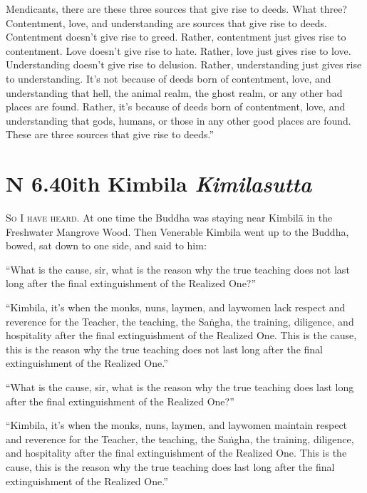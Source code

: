 \documentclass[12pt,openany]{book}%
\newcommand*{\suttatitleacronym}[1]{\smaller[2]{#1}\vspace*{.3em}}
\newcommand*{\suttatitletranslation}[1]{\linebreak{#1}}
\newcommand*{\suttatitleroot}[1]{\linebreak\smaller[2]\itshape{#1}}
\newcommand*{\tocacronym}[1]{\hspace*{-3.3em}{#1}\quad}
\newcommand*{\toctranslation}[1]{#1}
\newcommand*{\tocroot}[1]{(\textit{#1})}
\newcommand*{\scevam}[1]{\textsc{#1}}
\begin{document}
Mendicants, there are these three sources that give rise to deeds. What three? Contentment, love, and understanding are sources that give rise to deeds. Contentment doesn’t give rise to greed. Rather, contentment just gives rise to contentment. Love doesn’t give rise to hate. Rather, love just gives rise to love. Understanding doesn’t give rise to delusion. Rather, understanding just gives rise to understanding. It’s not because of deeds born of contentment, love, and understanding that hell, the animal realm, the ghost realm, or any other bad places are found. Rather, it’s because of deeds born of contentment, love, and understanding that gods, humans, or those in any other good places are found. These are three sources that give rise to deeds.” 

%
\section*{{\suttatitleacronym AN 6.40}{\suttatitletranslation With Kimbila }{\suttatitleroot Kimilasutta}}
\addcontentsline{toc}{section}{\tocacronym{AN 6.40} \toctranslation{With Kimbila } \tocroot{Kimilasutta}}

\scevam{So I have heard. }At one time the Buddha was staying near \textsanskrit{Kimbilā} in the Freshwater Mangrove Wood. Then Venerable Kimbila went up to the Buddha, bowed, sat down to one side, and said to him: 

“What is the cause, sir, what is the reason why the true teaching does not last long after the final extinguishment of the Realized One?” 

“Kimbila, it’s when the monks, nuns, laymen, and laywomen lack respect and reverence for the Teacher, the teaching, the \textsanskrit{Saṅgha}, the training, diligence, and hospitality after the final extinguishment of the Realized One. This is the cause, this is the reason why the true teaching does not last long after the final extinguishment of the Realized One.” 

“What is the cause, sir, what is the reason why the true teaching does last long after the final extinguishment of the Realized One?” 

“Kimbila, it’s when the monks, nuns, laymen, and laywomen maintain respect and reverence for the Teacher, the teaching, the \textsanskrit{Saṅgha}, the training, diligence, and hospitality after the final extinguishment of the Realized One. This is the cause, this is the reason why the true teaching does last long after the final extinguishment of the Realized One.” 
\end{document}

